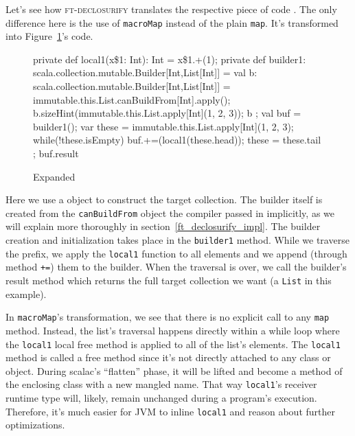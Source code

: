 Let's see how \textsc{ft-declosurify} translates the respective piece of code
. The only difference here is the use of \texttt{macroMap} instead
of the plain \texttt{map}. It's transformed into Figure~\ref{list_expansion_1}'s code.

\begin{figure}
\begin{scalaCode}
{
  private def local1(x\$1: Int): Int = x\$1.+(1);
  private def builder1: scala.collection.mutable.Builder[Int,List[Int]] = {
    val b: scala.collection.mutable.Builder[Int,List[Int]] =
immutable.this.List.canBuildFrom[Int].apply();
    b.sizeHint(immutable.this.List.apply[Int](1, 2, 3));
    b
  };
  val buf = builder1();
  var these = immutable.this.List.apply[Int](1, 2, 3);
  while(!these.isEmpty){
    buf.+=(local1(these.head));
    these = these.tail
  };
  buf.result
}
\end{scalaCode}
\caption[Expanded ]{Expanded }
\label{list_expansion_1}
\end{figure}

Here we use a  object to construct the target
collection. The builder itself is created from the
\texttt{canBuildFrom} object the compiler passed in implicitly, as we will explain more thoroughly in section~\ref{ft_declosurify_impl}. 
The builder creation and initialization takes place in the
\texttt{builder1} method. While we traverse the prefix, we apply the \texttt{local1} function to
all elements and we append (through method \texttt{+=}) them to the builder. When the
traversal is over, we call the builder's result method which returns the full
target collection we want (a \texttt{List} in this example).

In \texttt{macroMap}'s transformation, we see that there is no explicit call to any 
\texttt{map} method. Instead, the list's traversal happens directly within a while loop 
where the \texttt{local1} local free method is applied to all of the list's elements. 
The \texttt{local1} method is called a free method since it's not directly attached to any class or object.
During scalac's ``flatten'' phase, it will be lifted and become a method of
the enclosing class with a new mangled name. That way \texttt{local1}'s receiver runtime type
will, likely, remain unchanged during a program's execution. Therefore, it's much easier for JVM
to inline \texttt{local1} and reason about further optimizations.

